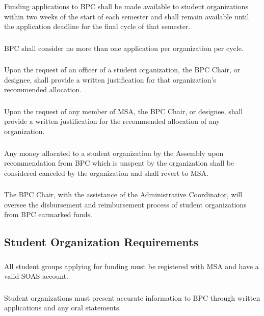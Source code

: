 \subsubsection{}
Funding applications to BPC shall be made available to student organizations within two weeks of the start of each semester and shall remain available until the application deadline for the final cycle of that semester.
\subsubsection{}
BPC shall consider no more than one application per organization per cycle.
\subsubsection{}
Upon the request of an officer of a student organization, the BPC Chair, or designee, shall provide a written justification for that organization's recommended allocation.
\subsubsection{}
Upon the request of any member of MSA, the BPC Chair, or designee, shall provide a written justification for the recommended allocation of any organization.
\subsubsection{}
Any money allocated to a student organization by the Assembly upon recommendation from BPC which is unspent by the organization shall be considered canceled by the organization and shall revert to MSA.
\subsubsection{}
The BPC Chair, with the assistance of the Administrative Coordinator, will oversee the disbursement and reimbursement process of student organizations from BPC earmarked funds.

\subsection{Student Organization Requirements}
\subsubsection{}
All student groups applying for funding must be registered with MSA and have a valid SOAS account.
\subsubsection{}
Student organizations must present accurate information to BPC through written applications and any oral statements.
